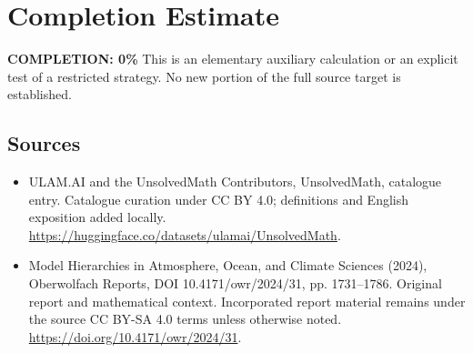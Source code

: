 \documentclass[11pt]{article}
\begin{document}
\section{Completion Estimate}
\noindent\textbf{COMPLETION: 0\%}
This is an elementary auxiliary calculation or an explicit test of a restricted strategy. No new portion of the full source target is established.

\subsection{Sources}
\begin{itemize}
\item[\hypertarget{source:statement:1}{S1}] ULAM.AI and the UnsolvedMath Contributors, UnsolvedMath, catalogue entry. Catalogue curation under CC BY 4.0; definitions and English exposition added locally.
\url{https://huggingface.co/datasets/ulamai/UnsolvedMath}.
\item[\hypertarget{source:statement:2}{S2}] Model Hierarchies in Atmosphere, Ocean, and Climate Sciences (2024), Oberwolfach Reports, DOI 10.4171/owr/2024/31, pp. 1731--1786. Original report and mathematical context. Incorporated report material remains under the source CC BY-SA 4.0 terms unless otherwise noted.
\url{https://doi.org/10.4171/owr/2024/31}.
\end{itemize}
\label{end:statement}
\end{document}
